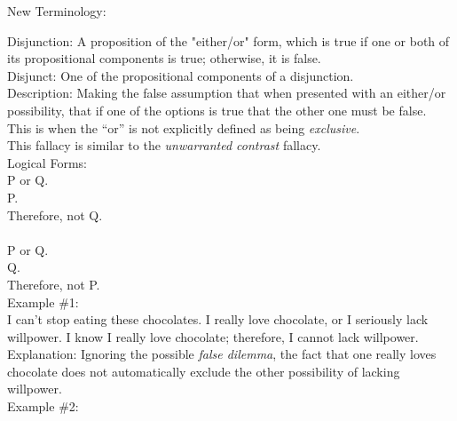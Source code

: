 \documentclass[a4paper,12pt,single,pdftex]{scrbook}
\begin{document}
  
    New Terminology:

    
      Disjunction: A proposition of the "either/or" form, which is true if one or both of its propositional components is true; otherwise, it is false.
    \\

    
      Disjunct: One of the propositional components of a disjunction.
    \\

    
      Description: Making the false assumption that when presented with an either/or possibility, that if one of the options is true that the other one must be false.  This is when the “or” is not explicitly defined as being {\it exclusive}.
    \\

    
      This fallacy is similar to the {\it unwarranted contrast} fallacy.
    \\

    
      Logical Forms:
    \\

    
      P or Q.
    \\

    
      P.
    \\

    
      Therefore, not Q.
    \\

    
       
    \\

    
      P or Q.
    \\

    
      Q.
    \\

    
      Therefore, not P.
    \\

    
      Example \#1:
    \\

    
      I can’t stop eating these chocolates.  I really love chocolate, or I seriously lack willpower.  I know I really love chocolate; therefore, I cannot lack willpower.
    \\

    
      Explanation: Ignoring the possible {\it false dilemma}, the fact that one really loves chocolate does not automatically exclude the other possibility of lacking willpower.
    \\

    
      Example \#2:
    \\
\end{document}
